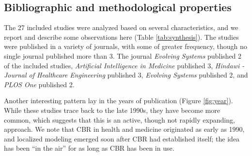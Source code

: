 \documentclass{article}
\begin{document}
\hypertarget{bibliographic-and-methodological-properties}{%
\subsection{Bibliographic and methodological
properties}\label{bibliographic-and-methodological-properties}}

The 27 included studies were analyzed based on several characteristics,
and we report and describe some observations here (Table
\ref{tab:synthesis}). The studies were published in a variety of
journals, with some of greater frequency, though no single journal
published more than 3. The journal \emph{Evolving Systems} published 2
of the included studies, \emph{Artificial Intelligence in Medicine}
published 3, \emph{Hindawi - Journal of Healthcare Engineering}
published 3, \emph{Evolving Systems} published 2, and \emph{PLOS One}
published 2.

Another interesting pattern lay in the years of publication (Figure
\ref{fig:year}). While these studies trace back to the late 1990s, they
have become more common, which suggests that this is an active, though
not rapidly expanding, approach. We note that CBR in health and medicine
originated as early as 1990, and localized modeling emerged soon after
CBR had established itself; the idea has been ``in the air'' for as long
as CBR has been in use.

\small
\end{document}
